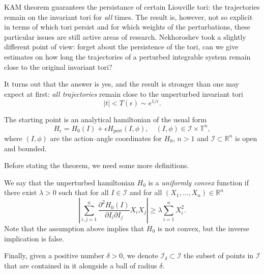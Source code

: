 \documentclass[english,fontsize=11pt,paper=b5]{scrbook}
\theoremstyle{definition}
\begin{document}
      KAM theorem guarantees the persistance of certain Liouville tori: the trajectories remain on the invariant tori for \emph{all} times. The result is, however, not so explicit in terms of which tori persist and for which weights of the perturbations, these particular issues are still active areas of research.
      Nekhoroshev took a slightly different point of view: forget about the persistence of the tori, can we give estimates on how long the trajectories of a perturbed integrable system remain close to the original invariant tori?

      It turns out that the answer is yes, and the result is stronger than one may expect at first: \emph{all trajectories} remain close to the unperturbed invariant tori 
      \begin{equation}
        |t| < T(\epsilon) \sim e^{1/\epsilon}.
      \end{equation}

      The starting point is an analytical hamiltonian of the usual form
      \begin{equation}\label{eq:hamneko}
        H_\epsilon = H_0(I) + \epsilon H_{\mathrm{pert}}(I, \phi), \quad (I,\phi)\in \mathcal{I}\times\mathbb{T}^n,
      \end{equation}
      where $(I,\phi)$ are the action--angle coordinates for $H_0$, $n>1$ and $\mathcal{I}\subset\mathbb{R}^n$ is open and bounded.

      Before stating the theorem, we need some more definitions.

      We say that the unperturbed hamiltonian $H_0$ is a \emph{uniformly convex} function if there exist $\lambda >0$ such that for all $I\in\mathcal{I}$ and for all $(X_1, \ldots, X_n)\in\mathbb{R}^n$
      \begin{equation}
        \left| \sum_{i,j=1}^n \frac{\partial^2 H_0(I)}{\partial I_i \partial I_j} X_i X_j\right| \geq \lambda \sum_{i=1}^n X_i^2.
      \end{equation}
      Note that the assumption above implies that $H_0$ is not convex, but the inverse implication is false.

      Finally, given a positive number $\delta >0$, we denote $\mathcal{I}_\delta \subset\mathcal{I}$ the subset of points in $\mathcal{I}$ that are contained in it alongside a ball of radius $\delta$.
\end{document}
